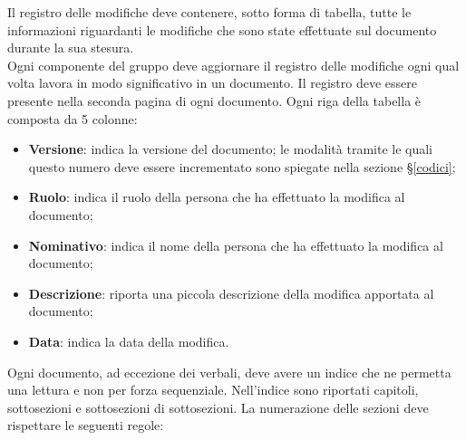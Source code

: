 
                Il registro delle modifiche deve contenere, sotto forma di tabella, tutte le informazioni
                riguardanti le modifiche che sono state effettuate sul documento durante la sua stesura. \\
                Ogni componente del gruppo deve aggiornare il registro delle modifiche ogni qual volta lavora in modo
                significativo in un documento. Il registro deve essere presente nella seconda pagina di ogni documento.
                Ogni riga della tabella è composta da 5 colonne:

                    \begin{itemize}
                        \item \textbf{Versione}: indica la versione del documento; le modalità tramite le quali questo numero
                        deve essere incrementato sono spiegate nella sezione §\ref{codici};
                        \item \textbf{Ruolo}: indica il ruolo della persona che ha effettuato la modifica al documento;
                        \item \textbf{Nominativo}: indica il nome della persona che ha effettuato la modifica al documento;
                        \item \textbf{Descrizione}: riporta una piccola descrizione della modifica apportata al documento;
                        \item \textbf{Data}: indica la data della modifica.
                    \end{itemize}


				Ogni documento, ad eccezione dei verbali, deve avere un indice che ne permetta una
				lettura  e non per forza sequenziale. Nell'indice sono 
				riportati capitoli, sottosezioni e sottosezioni di sottosezioni. 
				La numerazione delle sezioni deve rispettare le seguenti regole:


